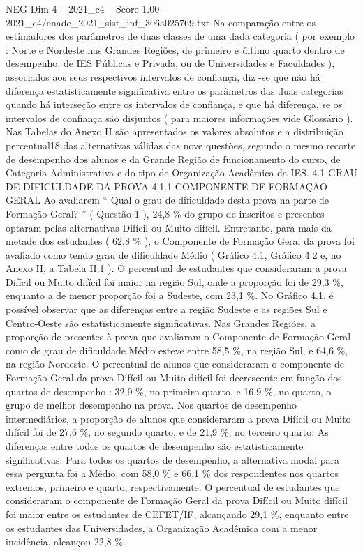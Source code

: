 \begin{textsample}{NEG Dim 4 – 2021\_c4 – Score 1.00 – 2021\_c4/enade\_2021\_sist\_inf\_306a025769.txt}
Na comparação entre os estimadores dos parâmetros de duas classes de uma dada categoria ( por exemplo : Norte e Nordeste nas Grandes Regiões, de primeiro e último quarto dentro de desempenho, de IES Públicas e Privada, ou de Universidades e Faculdades ), associados aos seus respectivos intervalos de confiança, diz -se que não há diferença estatisticamente significativa entre os parâmetros das duas categorias quando há interseção entre os intervalos de confiança, e que há diferença, se os intervalos de confiança são disjuntos ( para maiores informações vide Glossário ).
Nas Tabelas do Anexo II são apresentados os valores absolutos e a distribuição percentual18 das alternativas válidas das nove questões, segundo o mesmo recorte de desempenho dos alunos e da Grande Região de funcionamento do curso, de Categoria Administrativa e do tipo de Organização Acadêmica da IES. 4.1 GRAU DE DIFICULDADE DA PROVA 4.1.1 COMPONENTE DE FORMAÇÃO GERAL Ao avaliarem “ Qual o grau de dificuldade desta prova na parte de Formação Geral? ” ( Questão 1 ), 24,8 \% do grupo de inscritos e presentes optaram pelas alternativas Difícil ou Muito difícil.
Entretanto, para mais da metade dos estudantes ( 62,8 \% ), o Componente de Formação Geral da prova foi avaliado como tendo grau de dificuldade Médio ( Gráfico 4.1, Gráfico 4.2 e, no Anexo II, a Tabela II.1 ).
O percentual de estudantes que consideraram a prova Difícil ou Muito difícil foi maior na região Sul, onde a proporção foi de 29,3 \%, enquanto a de menor proporção foi a Sudeste, com 23,1 \%.
No Gráfico 4.1, é possível observar que as diferenças entre a região Sudeste e as regiões Sul e Centro-Oeste são estatisticamente significativas.
Nas Grandes Regiões, a proporção de presentes à prova que avaliaram o Componente de Formação Geral como de grau de dificuldade Médio esteve entre 58,5 \%, na região Sul, e 64,6 \%, na região Nordeste.
O percentual de alunos que consideraram o componente de Formação Geral da prova Difícil ou Muito difícil foi decrescente em função dos quartos de desempenho : 32,9 \%, no primeiro quarto, e 16,9 \%, no quarto, o grupo de melhor desempenho na prova.
Nos quartos de desempenho intermediários, a proporção de alunos que consideraram a prova Difícil ou Muito difícil foi de 27,6 \%, no segundo quarto, e de 21,9 \%, no terceiro quarto.
As diferenças entre todos os quartos de desempenho são estatisticamente significativas.
Para todos os quartos de desempenho, a alternativa modal para essa pergunta foi a Médio, com 58,0 \% e 66,1 \% dos respondentes nos quartos extremos, primeiro e quarto, respectivamente.
O percentual de estudantes que consideraram o componente de Formação Geral da prova Difícil ou Muito difícil foi maior entre os estudantes de CEFET/IF, alcançando 29,1 \%, enquanto entre os estudantes das Universidades, a Organização Acadêmica com a menor incidência, alcançou 22,8 \%.

\end{textsample}
